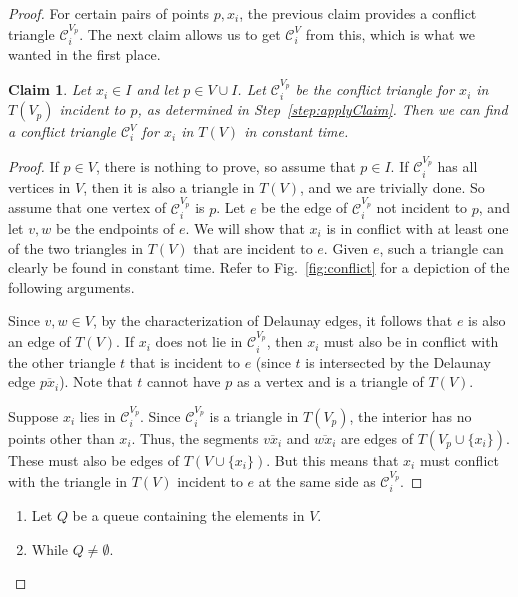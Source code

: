 \documentclass{siamltex}
\newcommand{\tconf}{\mathcal{C}}
\newtheorem{claim}[theorem]{Claim}
\begin{document}
\begin{proof}
For certain pairs of points $p,x_i$, the previous claim provides
a conflict triangle $\tconf_i^{V_p}$. The next claim allows us
to get $\tconf_i^V$ from this, which is what we wanted
in the first place.

\begin{claim}\label{clm:conflict}
Let $x_i \in I$ and let $p \in V \cup I$. Let $\tconf_i^{V_p}$ be the conflict
triangle for $x_i$ in $T(V_p)$ incident to $p$, as determined in 
Step~\ref{step:applyClaim}. Then we can find
a conflict triangle $\tconf_i^V$ for $x_i$ in $T(V)$ in constant time.
\end{claim}

\begin{proof}
If $p \in V$, there is nothing to prove, so assume that $p \in I$.
If $\tconf_i^{V_p}$ has all vertices in $V$, then it is also
a triangle in $T(V)$, and we are trivially done.
So assume that one vertex of $\tconf_i^{V_p}$ is $p$.
Let $e$ be the edge of $\tconf_i^{V_p}$ not incident to $p$, and let
$v,w$ be the endpoints of $e$.
We will show that $x_i$ is in conflict with at least one of the two
triangles in $T(V)$ that are incident to $e$. Given $e$, such a triangle can 
clearly be found in constant time. Refer to Fig.~\ref{fig:conflict} 
for a depiction of the following arguments.

Since $v,w \in V$, by the characterization
of Delaunay edges, it follows that $e$ is also an edge of $T(V)$. 
If $x_i$ does not lie in $\tconf_i^{V_p}$, then $x_i$ must 
also be in conflict with the other triangle $t$ that is incident
to $e$ (since $t$ is intersected by the Delaunay edge $\overline{px_i}$).
Note that $t$ cannot have $p$ as a vertex and is a triangle of $T(V)$.

Suppose $x_i$ lies in $\tconf_i^{V_p}$. Since $\tconf_i^{V_p}$
is a triangle in $T(V_p)$, the interior has no points other
than $x_i$.
Thus, the segments $\overline{vx_i}$ and $\overline{wx_i}$ 
are edges of $T(V_p \cup \{x_i\})$.
These must also be edges of 
$T(V \cup \{x_i\})$. But this means that $x_i$ must conflict
with the triangle in $T(V)$ incident to $e$ at the same side as
$\tconf_i^{V_p}$.
\end{proof}
\medskip

\begin{algorithm}
\begin{enumerate}
\item Let $Q$ be a queue containing the elements in $V$. 

\item\label{step:Qloop} While $Q \not= \emptyset$.


\end{enumerate}
\end{algorithm}
\end{proof}
\end{document}
